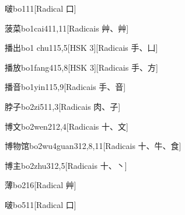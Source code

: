 \begin{entry}{啵}{bo1}{11}[Radical ⼝]
\end{entry}

\begin{entry}{菠菜}{bo1cai4}{11,11}[Radicais ⾋、⾋]
\end{entry}

\begin{entry}{播出}{bo1 chu1}{15,5}[HSK 3][Radicais ⼿、⼐]
\end{entry}

\begin{entry}{播放}{bo1fang4}{15,8}[HSK 3][Radicais ⼿、⽅]
\end{entry}

\begin{entry}{播音}{bo1yin1}{15,9}[Radicais ⼿、⾳]
\end{entry}

\begin{entry}{脖子}{bo2zi5}{11,3}[Radicais ⾁、⼦]
\end{entry}

\begin{entry}{博文}{bo2wen2}{12,4}[Radicais ⼗、⽂]
\end{entry}

\begin{entry}{博物馆}{bo2wu4guan3}{12,8,11}[Radicais ⼗、⽜、⾷]
\end{entry}

\begin{entry}{博主}{bo2zhu3}{12,5}[Radicais ⼗、⼂]
\end{entry}

\begin{entry}{薄}{bo2}{16}[Radical ⾋]
\end{entry}

\begin{entry}{啵}{bo5}{11}[Radical ⼝]
\end{entry}

